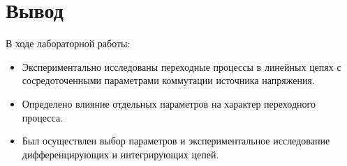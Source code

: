\section{Вывод}
В ходе лабораторной работы:
\begin{itemize}
\item Экспериментально исследованы переходные процессы в линейных цепях с сосредоточенными параметрами коммутации источника напряжения.
\item Определено влияние отдельных параметров на характер переходного процесса.
\item Был осуществлен выбор параметров и экспериментальное исследование дифференцирующих и интегрирующих цепей.
\end{itemize}
\clearpage
